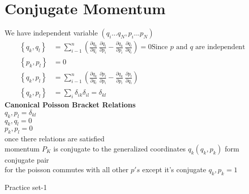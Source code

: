 \section{Conjugate Momentum}
We have independent variable $(q_i...q_N,p_i...p_N)$
\begin{align*}
\left\lbrace q_k,q_l\right\rbrace &=\sum\limits_{i-1}^{n}\left(\frac{\partial q_k}{\partial q_i}\ \frac{\partial q_l}{\partial p_i}-\frac{\partial q_k}{\partial p_i}\ \frac{\partial q_l}{\partial q_i}\right)=0 \text{Since $p$ and $q$ are independent}\\
\left\lbrace p_k,p_l\right\rbrace  &=0  \\
\left\lbrace q_k,p_l\right\rbrace  &=\sum\limits_{i-1}^{n}\left(\frac{\partial q_k}{\partial q_i}\ \frac{\partial p_l}{\partial p_i}-\frac{\partial q_k}{\partial p_i}\ \frac{\partial p_l}{\partial q_i}\right)\\
\left\lbrace q_k,p_l\right\rbrace  &=\sum\limits_{i}\delta_{ik}\delta_{il}=\delta_{kl}
\end{align*}
\textbf{Canonical Poisson Bracket Relations}\\
${q_k,p_l}=\delta_{kl}$\\
${q_k,q_l}=0$\\
${p_k,p_l}=0$\\
once there relations are satisfied\\
momentum $P_K$ is conjugate to the generalized coordinates $q_k (q_k,p_k)$ form conjugate pair\\
for the poisson commutes with all other $p's$ except it's conjugate ${q_k,p_k}=1$
\newpage
\begin{abox}
	Practice set-1
\end{abox}

